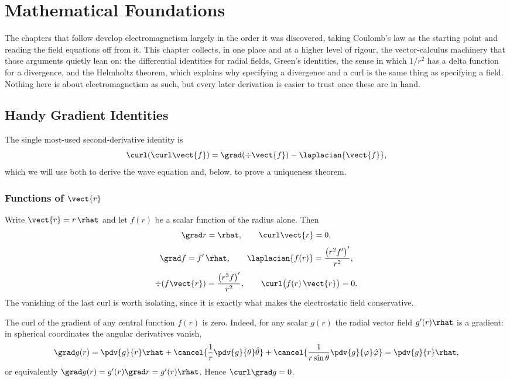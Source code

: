 \chapter{Mathematical Foundations}

The chapters that follow develop electromagnetism largely in the order it was discovered, taking Coulomb's law as the starting point and reading the field equations off from it. This chapter collects, in one place and at a higher level of rigour, the vector-calculus machinery that those arguments quietly lean on: the differential identities for radial fields, Green's identities, the sense in which $1/r^2$ has a delta function for a divergence, and the Helmholtz theorem, which explains why specifying a divergence and a curl is the same thing as specifying a field. Nothing here is about electromagnetism as such, but every later derivation is easier to trust once these are in hand.

\section{Handy Gradient Identities}

The single most-used second-derivative identity is
\[
    \curl(\curl \vect{f}) = \grad(\div \vect{f}) - \laplacian{\vect{f}},
\]
which we will use both to derive the wave equation and, below, to prove a uniqueness theorem.

\subsection{Functions of \texorpdfstring{$\vect{r}$}{r}}

Write $\vect{r} = r\,\rhat$ and let $f(r)$ be a scalar function of the radius alone. Then
\[
    \grad r = \rhat, \qquad \curl \vect{r} = 0,
\]
\[
    \grad f = f'\,\rhat, \qquad \laplacian{f(r)} = \frac{\left(r^2 f'\right)'}{r^2},
\]
\[
    \div(f\vect{r}) = \frac{\left(r^3 f\right)'}{r^2}, \qquad \curl\bigl(f(r)\,\vect{r}\bigr) = 0.
\]
The vanishing of the last curl is worth isolating, since it is exactly what makes the electrostatic field conservative.

\begin{theorem}
The curl of the gradient of any central function $f(r)$ is zero. Indeed, for any scalar $g(r)$ the radial vector field $g'(r)\rhat$ is a gradient: in spherical coordinates the angular derivatives vanish,
\[
    \grad g(r) = \pdv{g}{r}\rhat + \cancel{\frac{1}{r}\pdv{g}{\theta}\hat{\theta}} + \cancel{\frac{1}{r\sin\theta}\pdv{g}{\varphi}\hat{\varphi}} = \pdv{g}{r}\rhat,
\]
or equivalently $\grad g(r) = g'(r)\grad r = g'(r)\rhat$. Hence $\curl \grad g = 0$.
\end{theorem}

